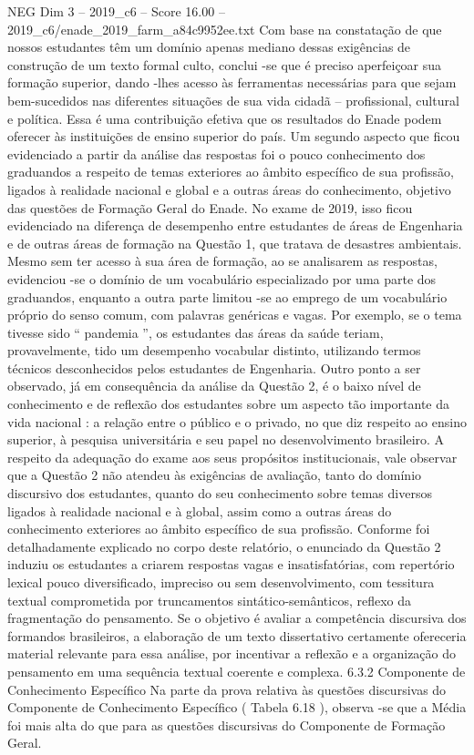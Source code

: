 \begin{textsample}{NEG Dim 3 – 2019\_c6 – Score 16.00 – 2019\_c6/enade\_2019\_farm\_a84c9952ee.txt}
Com base na constatação de que nossos estudantes têm um domínio apenas mediano dessas exigências de construção de um texto formal culto, conclui -se que é preciso aperfeiçoar sua formação superior, dando -lhes acesso às ferramentas necessárias para que sejam bem-sucedidos nas diferentes situações de sua vida cidadã – profissional, cultural e política.
Essa é uma contribuição efetiva que os resultados do Enade podem oferecer às instituições de ensino superior do país.
Um segundo aspecto que ficou evidenciado a partir da análise das respostas foi o pouco conhecimento dos graduandos a respeito de temas exteriores ao âmbito específico de sua profissão, ligados à realidade nacional e global e a outras áreas do conhecimento, objetivo das questões de Formação Geral do Enade.
No exame de 2019, isso ficou evidenciado na diferença de desempenho entre estudantes de áreas de Engenharia e de outras áreas de formação na Questão 1, que tratava de desastres ambientais.
Mesmo sem ter acesso à sua área de formação, ao se analisarem as respostas, evidenciou -se o domínio de um vocabulário especializado por uma parte dos graduandos, enquanto a outra parte limitou -se ao emprego de um vocabulário próprio do senso comum, com palavras genéricas e vagas.
Por exemplo, se o tema tivesse sido “ pandemia ”, os estudantes das áreas da saúde teriam, provavelmente, tido um desempenho vocabular distinto, utilizando termos técnicos desconhecidos pelos estudantes de Engenharia.
Outro ponto a ser observado, já em consequência da análise da Questão 2, é o baixo nível de conhecimento e de reflexão dos estudantes sobre um aspecto tão importante da vida nacional : a relação entre o público e o privado, no que diz respeito ao ensino superior, à pesquisa universitária e seu papel no desenvolvimento brasileiro.
A respeito da adequação do exame aos seus propósitos institucionais, vale observar que a Questão 2 não atendeu às exigências de avaliação, tanto do domínio discursivo dos estudantes, quanto do seu conhecimento sobre temas diversos ligados à realidade nacional e à global, assim como a outras áreas do conhecimento exteriores ao âmbito específico de sua profissão.
Conforme foi detalhadamente explicado no corpo deste relatório, o enunciado da Questão 2 induziu os estudantes a criarem respostas vagas e insatisfatórias, com repertório lexical pouco diversificado, impreciso ou sem desenvolvimento, com tessitura textual comprometida por truncamentos sintático-semânticos, reflexo da fragmentação do pensamento.
Se o objetivo é avaliar a competência discursiva dos formandos brasileiros, a elaboração de um texto dissertativo certamente ofereceria material relevante para essa análise, por incentivar a reflexão e a organização do pensamento em uma sequência textual coerente e complexa. 6.3.2 Componente de Conhecimento Específico Na parte da prova relativa às questões discursivas do Componente de Conhecimento Específico ( Tabela 6.18 ), observa -se que a Média foi mais alta do que para as questões discursivas do Componente de Formação Geral.

\end{textsample}
